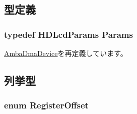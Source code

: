 \subsection{型定義}
\hypertarget{classHDLcd_a31ccb03af3b5962a67bed42eca6ce2f0}{
\subsubsection[{Params}]{\setlength{\rightskip}{0pt plus 5cm}typedef HDLcdParams {\bf Params}}}
\label{classHDLcd_a31ccb03af3b5962a67bed42eca6ce2f0}


\hyperlink{classAmbaDmaDevice_ab612ceb7381438552927b7ed0aed5099}{AmbaDmaDevice}を再定義しています。

\subsection{列挙型}
\hypertarget{classHDLcd_a5589603d1462868f128ddcda455b167a}{
\subsubsection[{RegisterOffset}]{\setlength{\rightskip}{0pt plus 5cm}enum {\bf RegisterOffset}}}
\label{classHDLcd_a5589603d1462868f128ddcda455b167a}
